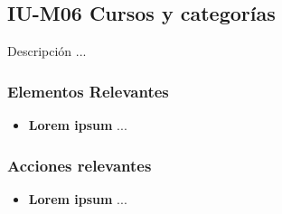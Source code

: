 
\subsection{IU-M06 Cursos y categorías}

 Descripción ...


\subsubsection{Elementos Relevantes}

    \begin{itemize}
    \item {\bf Lorem ipsum}
        ...
    \end{itemize}

\subsubsection{Acciones relevantes}

    \begin{itemize}
    \item {\bf Lorem ipsum}
        ...
    \end{itemize}

\clearpage
